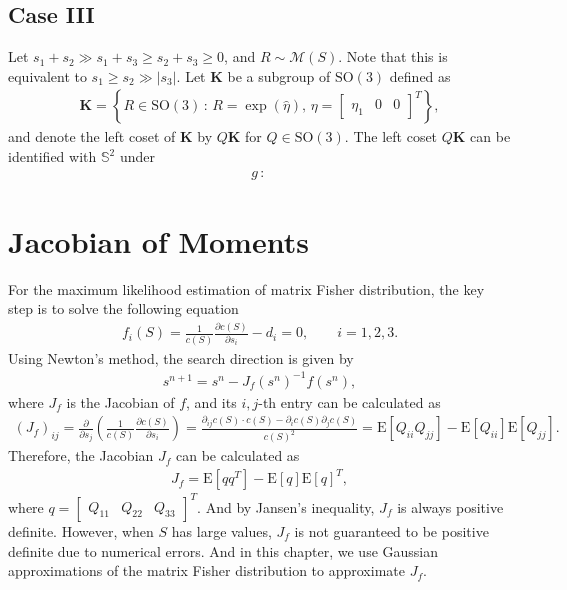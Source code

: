 \documentclass[10pt]{article}
\newcommand{\expect}[1]{\ensuremath{\mathrm{E}\left[ #1 \right]}}
\newcommand{\SO}{\ensuremath{\mathrm{SO(3)}}}
\begin{document}
\subsection{Case III}
Let $s_1+s_2 \gg s_1+s_3 \geq s_2+s_3 \geq 0$, and $R \sim \mathcal{M}(S)$.
Note that this is equivalent to $s_1 \geq s_2 \gg |s_3|$.
Let $\mathbf{K}$ be a subgroup of $\SO$ defined as
\begin{align}
	\mathbf{K} = \left\{ R\in\SO \,:\, R = \exp(\hat{\eta}),\, \eta = \begin{bmatrix} \eta_1 & 0 & 0 \end{bmatrix}^T \right\},
\end{align}
and denote the left coset of $\mathbf{K}$ by $Q\mathbf{K}$ for $Q\in\SO$.
The left coset $Q\mathbf{K}$ can be identified with $\mathbb{S}^2$ under
\begin{align}
	g\, :\, 
\end{align}

\section{Jacobian of Moments}

For the maximum likelihood estimation of matrix Fisher distribution, the key step is to solve the following equation
\begin{align}
	f_i(S) = \frac{1}{c(S)} \frac{\partial c(S)}{\partial s_i} - d_i = 0, \qquad i = 1,2,3.
\end{align}
Using Newton's method, the search direction is given by
\begin{align}
	s^{n+1} = s^n - J_f(s^n)^{-1} f(s^n),
\end{align}
where $J_f$ is the Jacobian of $f$, and its $i,j$-th entry can be calculated as
\begin{align}
	(J_f)_{ij} = \frac{\partial}{\partial s_j} \left( \frac{1}{c(S)} \frac{\partial c(S)}{\partial s_i} \right) = \frac{\partial_{ij}c(S)\cdot c(S) - \partial_i c(S) \partial_j c(S)}{c(S)^2} = \expect{Q_{ii}Q_{jj}} - \expect{Q_{ii}}\expect{Q_{jj}}.
\end{align}
Therefore, the Jacobian $J_f$ can be calculated as
\begin{align}
	J_f = \expect{qq^T} - \expect{q}\expect{q}^T,
\end{align}
where $q = \begin{bmatrix} Q_{11} & Q_{22} & Q_{33} \end{bmatrix}^T$.
And by Jansen's inequality, $J_f$ is always positive definite.
However, when $S$ has large values, $J_f$ is not guaranteed to be positive definite due to numerical errors.
And in this chapter, we use Gaussian approximations of the matrix Fisher distribution to approximate $J_f$.
\end{document}
